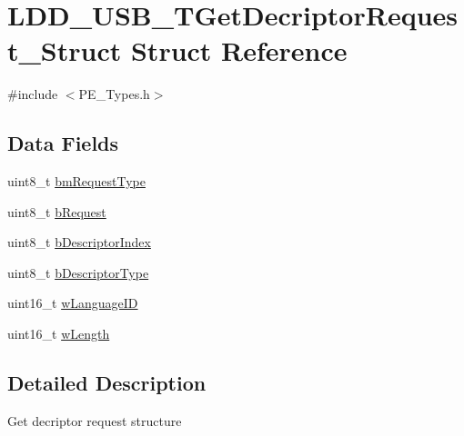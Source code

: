 \hypertarget{struct_l_d_d___u_s_b___t_get_decriptor_request___struct}{\section{L\-D\-D\-\_\-\-U\-S\-B\-\_\-\-T\-Get\-Decriptor\-Request\-\_\-\-Struct Struct Reference}
\label{struct_l_d_d___u_s_b___t_get_decriptor_request___struct}
}


{\ttfamily \#include $<$P\-E\-\_\-\-Types.\-h$>$}

\subsection*{Data Fields}
\begin{DoxyCompactItemize}
\item 
uint8\-\_\-t \hyperlink{struct_l_d_d___u_s_b___t_get_decriptor_request___struct_a1a1b11552faed99a5e0b5a08c315aa2e}{bm\-Request\-Type}
\item 
uint8\-\_\-t \hyperlink{struct_l_d_d___u_s_b___t_get_decriptor_request___struct_aa7651472aa5110086f335c0b79c0bc5b}{b\-Request}
\item 
uint8\-\_\-t \hyperlink{struct_l_d_d___u_s_b___t_get_decriptor_request___struct_acdeb70eb4f83efe2fb38cf58aa99e4f1}{b\-Descriptor\-Index}
\item 
uint8\-\_\-t \hyperlink{struct_l_d_d___u_s_b___t_get_decriptor_request___struct_abfebebabbabe02e816da51fe202282a7}{b\-Descriptor\-Type}
\item 
uint16\-\_\-t \hyperlink{struct_l_d_d___u_s_b___t_get_decriptor_request___struct_a228c41af26c45c1fa18d964c0702a4b4}{w\-Language\-I\-D}
\item 
uint16\-\_\-t \hyperlink{struct_l_d_d___u_s_b___t_get_decriptor_request___struct_af9ac7409b4031aa6f3ec5da9d79b06eb}{w\-Length}
\end{DoxyCompactItemize}


\subsection{Detailed Description}
Get decriptor request structure 

